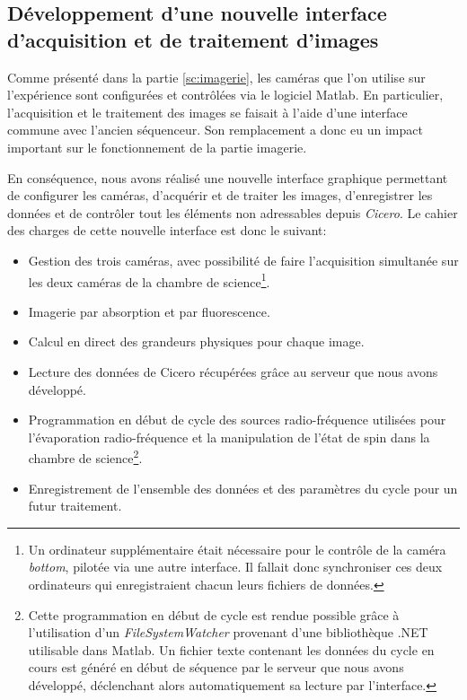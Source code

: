 \subsection{Développement d'une nouvelle interface d'acquisition et de traitement d'images}
Comme présenté dans la partie \ref{sc:imagerie}, les caméras que l'on utilise sur l'expérience sont configurées et contrôlées via le logiciel Matlab. En particulier, l'acquisition et le traitement des images se faisait à l'aide d'une interface commune avec l'ancien séquenceur. Son remplacement a donc eu un impact important sur le fonctionnement de la partie imagerie. 

En conséquence, nous avons réalisé une nouvelle interface graphique permettant de configurer les caméras, d'acquérir et de traiter les images, d'enregistrer les données et de contrôler tout les éléments non adressables depuis \emph{Cicero}. Le cahier des charges de cette nouvelle interface est donc le suivant:
\begin{itemize}
\item[\textendash] Gestion des trois caméras, avec possibilité de faire l'acquisition simultanée sur les deux caméras de la chambre de science\footnote{Un ordinateur supplémentaire était nécessaire pour le contrôle de la caméra \textit{bottom}, pilotée via une autre interface. Il fallait donc synchroniser ces deux ordinateurs qui enregistraient chacun leurs fichiers de données.}.
\item[\textendash] Imagerie par absorption et par fluorescence.
\item[\textendash] Calcul en direct des grandeurs physiques pour chaque image.
\item[\textendash] Lecture des données de Cicero récupérées grâce au serveur que nous avons développé.
\item[\textendash] Programmation en début de cycle des sources radio-fréquence utilisées pour l'évaporation radio-fréquence et la manipulation de l'état de spin dans la chambre de science\footnote{Cette programmation en début de cycle est rendue possible grâce à l'utilisation d'un \emph{FileSystemWatcher} provenant d'une bibliothèque .NET utilisable dans Matlab. Un fichier texte contenant les données du cycle en cours est généré en début de séquence par le serveur que nous avons développé, déclenchant alors automatiquement sa lecture par l'interface.}.
\item[\textendash] Enregistrement de l'ensemble des données et des paramètres du cycle pour un futur traitement.
\end{itemize}
